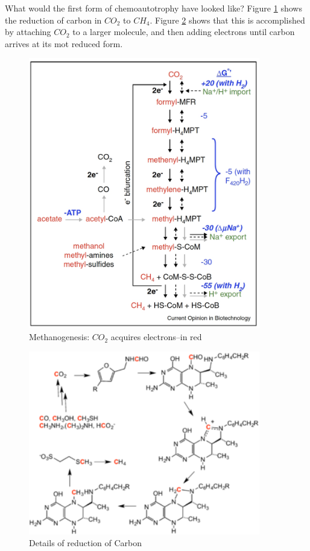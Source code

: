 \documentclass[]{article}
\begin{document}
What would the first form of chemoautotrophy have looked like? Figure \ref{fig:Methanogenesis} \cite{costa2014metabolic} shows the reduction of carbon in $CO_2$ to $CH_4$. Figure \ref{fig:320px-Methanogenesis_cycle} \cite{wiki:methanogenesis} shows that this is accomplished by attaching $CO_2$ to a larger molecule, and then adding electrons until carbon arrives at its mot reduced form. 

\begin{figure}[H]
	\caption{Methanogenesis: $CO_2$ acquires electrons--in red} \label{fig:Methanogenesis} 
	\includegraphics[width=0.9\textwidth]{Methanogenesis}
\end{figure}

\begin{figure}[H]
	\caption{Details of reduction of Carbon} \label{fig:320px-Methanogenesis_cycle} 
	\includegraphics[width=0.9\textwidth]{320px-Methanogenesis_cycle}
\end{figure}
\end{document}
